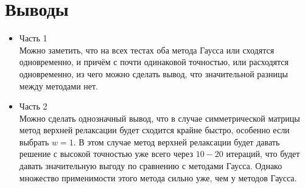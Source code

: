\documentclass[a4paper,12pt,titlepage,finall]{article}
\begin{document}
\section{Выводы}

\begin{itemize}
\item Часть 1\\
Можно заметить, что на всех тестах оба метода Гаусса или сходятся одновременно, и причём с почти одинаковой точностью, или расходятся одновременно, из чего можно сделать вывод, что значительной разницы между методами нет.

\item Часть 2\\
Можно сделать однозначный вывод, что в случае симметрической матрицы метод верхней релаксации будет сходится крайне быстро, особенно если выбрать $w = 1$. В этом случае метод верхней релаксации будет давать решение с высокой точностью уже всего через $10-20$ итераций, что будет давать значительную выгоду по сравнению с методами Гаусса. Однако множество применимости этого метода сильно уже, чем у методов Гаусса.


\end{itemize}

\newpage
\end{document}
